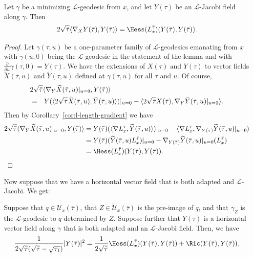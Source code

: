 \begin{lemma}\label{lem:l-length-hessian-jacobi-formula}
\label{Jacobi}
Let  $\gamma$ be a minimizing ${\mathcal L}$-geodesic from $x$, and
let $Y(\tau)$ be an ${\mathcal L}$-Jacobi field along $\gamma$. Then
$$2\sqrt{\bar\tau}\langle\nabla_XY(\bar\tau),Y(\bar\tau)\rangle = \Hess(L_x^{\bar\tau})(Y(\bar\tau),
Y(\bar\tau)).$$
\end{lemma}

\begin{proof}
Let $\gamma(\tau,u)$ be a one-parameter family of ${\mathcal
L}$-geodesics emanating from $x$ with $\gamma(u,0)$ being the
${\mathcal L}$-geodesic in the statement of the lemma  and with
$\frac{\partial}{\partial u}\gamma(\tau,0)=Y(\tau)$. We have the
extensions of $X(\tau)$ and $Y(\tau)$ to vector fields $\widetilde
X(\tau,u)$ and $\widetilde Y(\tau,u)$ defined at $\gamma(\tau,u)$
for all $\tau$ and $u$. Of course,
\begin{eqnarray*}
\lefteqn{2\sqrt{\bar\tau}\langle \nabla_Y\widetilde
X(\bar\tau,u)|_{u=0},Y(\bar\tau)\rangle  } \\
& = & Y(\langle 2\sqrt{\bar\tau}\widetilde X(\bar\tau,u),\widetilde
Y(\bar\tau,u)\rangle)|_{u=0}-\langle
2\sqrt{\bar\tau}X(\bar\tau),\nabla_Y\widetilde
Y(\bar\tau,u)|_{u=0}\rangle.\end{eqnarray*} Then by
Corollary~\ref{cor:l-length-gradient} we have
\begin{align*}
2\sqrt{\bar\tau}\langle \nabla_Y\widetilde
X(\bar\tau,u)|_{u=0},Y(\bar\tau)\rangle & = Y(\bar\tau)(\langle
\nabla L_x^{\bar\tau},\widetilde
Y(\bar\tau,u)\rangle)|_{u=0}-\langle \nabla
L_x^{\bar\tau},\nabla_{Y(\bar\tau)}\widetilde
Y(\bar\tau,u)|_{u=0}\rangle
\\
& = Y(\bar\tau)(\widetilde Y(\bar\tau,u)
L_x^{\bar\tau})|_{u=0}-\nabla_{Y(\bar\tau)}\widetilde
Y(\bar\tau,u)|_{u=0}(L_x^{\bar\tau}) \\ & =  \Hess(L_x^{\bar\tau})(Y(\bar\tau),Y(\bar\tau)).
\end{align*}
\end{proof}


Now suppose that we have a horizontal vector field that is both
adapted and ${\mathcal L}$-Jacobi. We get:

\begin{lemma}\label{lem:adapted-jacobi-hessian-relation}
\label{adapjab}
Suppose that $q\in {\mathcal U}_x(\bar\tau)$, that $Z\in \widetilde
{\mathcal U}_x(\bar\tau)$ is the pre-image of $q$, and that
$\gamma_Z$ is the  ${\mathcal L}$-geodesic to $q$ determined by $Z$.
Suppose further that $Y(\tau)$ is a horizontal vector field along
$\gamma$ that is both adapted and an ${\mathcal L}$-Jacobi field.
Then,  we have
$$\frac{1}{2\sqrt{\bar\tau}(\sqrt{\bar\tau}-\sqrt{\tau_1})}|Y(\bar\tau)|^2
=\frac{1}{2\sqrt{\bar\tau}}\Hess(L_x^{\bar\tau})(Y(\bar\tau),Y(\bar\tau))+\Ric(Y(\bar\tau),Y(\bar\tau)).$$
\end{lemma}

